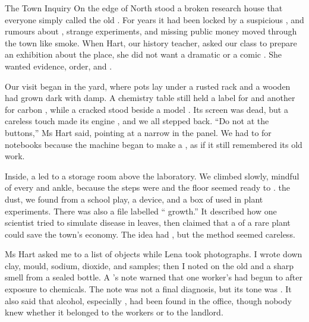 \documentclass[12pt]{nextbook}
\begin{document}
\begin{readersection}{The Town Inquiry}
On the edge of North  stood a broken research house that everyone simply called the old . For years it had been locked by a suspicious , and rumours about , strange experiments, and missing public money moved through the town like smoke. When  Hart, our history teacher, asked our class to prepare an  exhibition about the place, she did not want a dramatic  or a comic . She wanted evidence, order, and .

Our  visit began in the yard, where  pots lay under a rusted rack and a wooden  had grown dark with damp. A chemistry table still held a label for  and another for carbon , while a cracked  stood beside a model . Its  screen was dead, but a careless touch made its engine , and we all stepped back. “Do not  at the buttons,” Ms Hart said, pointing at a narrow  in the panel. We had to  for notebooks because the machine began to make a  , as if it still remembered its old work.

Inside, a  led to a storage room above the laboratory. We climbed slowly, mindful of every  and ankle, because the steps were  and the floor seemed ready to .  the dust, we found  from a school play, a   device, and a box of  used in plant experiments. There was also a  file labelled “ growth.” It described how one scientist tried to simulate disease in leaves, then claimed that a  of a rare plant could save the town’s economy. The idea had , but the method seemed careless.

Ms Hart asked me to  a list of objects while Lena took photographs. I wrote down clay, mould, sodium, dioxide, and  samples; then I noted  on the old  and a sharp  smell from a sealed bottle. A ’s note warned that one worker’s  had begun to  after  exposure to chemicals. The note was not a final diagnosis, but its tone was . It also said that alcohol, especially , had been found in the office, though nobody knew whether it belonged to the workers or to the landlord.


\end{readersection}
\end{document}

